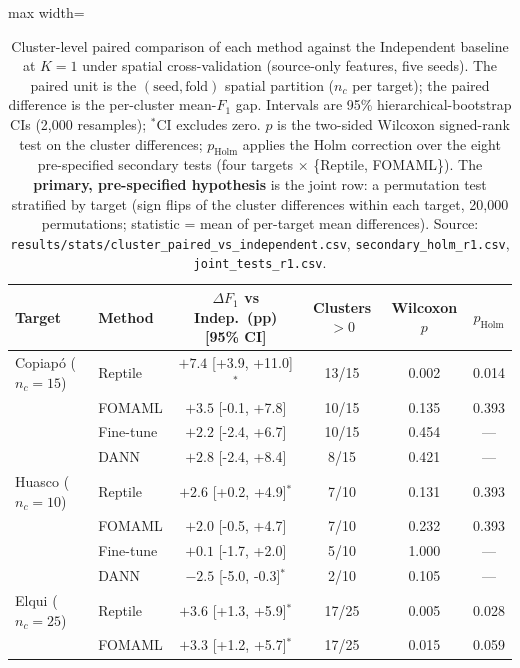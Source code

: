 \begin{table}[ht]
    \centering
    \caption{Cluster-level paired comparison of each method against the Independent baseline at $K=1$ under spatial cross-validation (source-only features, five seeds). The paired unit is the $(\text{seed},\text{fold})$ spatial partition ($n_c$ per target); the paired difference is the per-cluster mean-$F_1$ gap. Intervals are 95\% hierarchical-bootstrap CIs (2{,}000 resamples); $^{*}$CI excludes zero. $p$ is the two-sided Wilcoxon signed-rank test on the cluster differences; $p_{\text{Holm}}$ applies the Holm correction over the eight pre-specified secondary tests (four targets $\times$ \{Reptile, FOMAML\}). The \textbf{primary, pre-specified hypothesis} is the joint row: a permutation test stratified by target (sign flips of the cluster differences within each target, 20{,}000 permutations; statistic = mean of per-target mean differences). Source: \texttt{results/stats/cluster\_paired\_vs\_independent.csv}, \texttt{secondary\_holm\_r1.csv}, \texttt{joint\_tests\_r1.csv}.}
    \label{tab:cluster_paired}
    \footnotesize
    \begin{adjustbox}{max width=\textwidth}
    \begin{tabular}{llcccc}
        \toprule
        \textbf{Target} & \textbf{Method} & \textbf{$\Delta F_1$ vs Indep.\ (pp) [95\% CI]} & \textbf{Clusters $>0$} & \textbf{Wilcoxon $p$} & \textbf{$p_{\text{Holm}}$} \\
        \midrule
        Copiap\'o ($n_c=15$) & Reptile & $+7.4$ [+3.9, +11.0]$^{*}$ & 13/15 & 0.002 & 0.014 \\
         & FOMAML & $+3.5$ [-0.1, +7.8] & 10/15 & 0.135 & 0.393 \\
         & Fine-tune & $+2.2$ [-2.4, +6.7] & 10/15 & 0.454 & --- \\
         & DANN & $+2.8$ [-2.4, +8.4] & 8/15 & 0.421 & --- \\
        \midrule
        Huasco ($n_c=10$) & Reptile & $+2.6$ [+0.2, +4.9]$^{*}$ & 7/10 & 0.131 & 0.393 \\
         & FOMAML & $+2.0$ [-0.5, +4.7] & 7/10 & 0.232 & 0.393 \\
         & Fine-tune & $+0.1$ [-1.7, +2.0] & 5/10 & 1.000 & --- \\
         & DANN & $-2.5$ [-5.0, -0.3]$^{*}$ & 2/10 & 0.105 & --- \\
        \midrule
        Elqui ($n_c=25$) & Reptile & $+3.6$ [+1.3, +5.9]$^{*}$ & 17/25 & 0.005 & 0.028 \\
         & FOMAML & $+3.3$ [+1.2, +5.7]$^{*}$ & 17/25 & 0.015 & 0.059 \\

\end{tabular}
\end{adjustbox}
\end{table}
